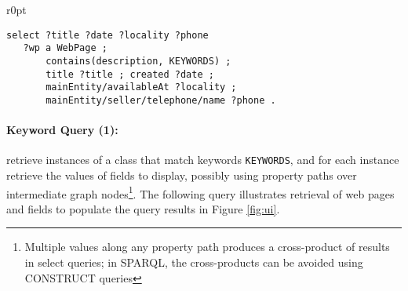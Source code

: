 \begin{wrapfigure}{r}{0pt}
{\footnotesize
\begin{verbatim}
select ?title ?date ?locality ?phone
   ?wp a WebPage ; 
       contains(description, KEYWORDS) ;   
       title ?title ; created ?date ;
       mainEntity/availableAt ?locality ;
       mainEntity/seller/telephone/name ?phone .
\end{verbatim}}
\end{wrapfigure}
\paragraph{Keyword Query (1):} retrieve instances of a class that match keywords \verb|KEYWORDS|, and for each instance retrieve the values of fields to display, possibly using property paths over intermediate graph nodes\footnote{Multiple values along any property path produces a cross-product of results in select queries; in SPARQL, the cross-products can be avoided using  CONSTRUCT queries}.
The following query illustrates retrieval of web pages and fields to populate the query results in Figure \ref{fig:ui}.
%

